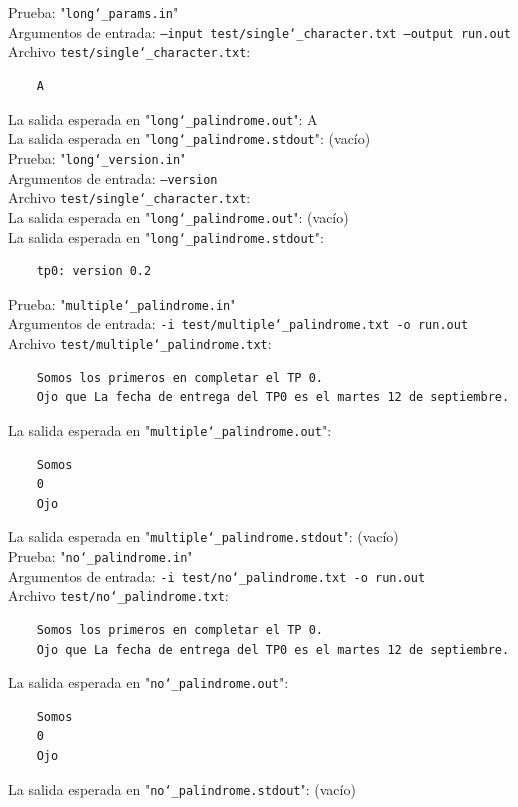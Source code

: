 \documentclass[a4paper,10pt]{article}
\begin{document}
      Prueba: "\texttt{long\char`_params.in}" \\
    Argumentos de entrada: \texttt{--input test/single\char`_character.txt --output run.out}\\
    Archivo \texttt{test/single\char`_character.txt}: \\
    \begin{Verbatim}
    A
    \end{Verbatim}
    La salida esperada en "\texttt{long\char`_palindrome.out}": A\\
    La salida esperada en "\texttt{long\char`_palindrome.stdout}": (vacío)\\
  
        Prueba: "\texttt{long\char`_version.in}" \\
    Argumentos de entrada: \texttt{--version}\\
    Archivo \texttt{test/single\char`_character.txt}: \\

    La salida esperada en "\texttt{long\char`_palindrome.out}": (vacío)\\
    La salida esperada en "\texttt{long\char`_palindrome.stdout}": \\
    \begin{Verbatim}
    tp0: version 0.2
    \end{Verbatim}
  
    Prueba: "\texttt{multiple\char`_palindrome.in}" \\
    Argumentos de entrada: \texttt{-i test/multiple\char`_palindrome.txt -o run.out}\\
    Archivo \texttt{test/multiple\char`_palindrome.txt}: \\
    \begin{Verbatim}
    Somos los primeros en completar el TP 0.
    Ojo que La fecha de entrega del TP0 es el martes 12 de septiembre.
    \end{Verbatim}
    La salida esperada en "\texttt{multiple\char`_palindrome.out}":\\
        \begin{Verbatim}
    Somos
    0
    Ojo
    \end{Verbatim}
    La salida esperada en "\texttt{multiple\char`_palindrome.stdout}": (vacío)\\
  
    Prueba: "\texttt{no\char`_palindrome.in}" \\
    Argumentos de entrada: \texttt{-i test/no\char`_palindrome.txt -o run.out}\\
    Archivo \texttt{test/no\char`_palindrome.txt}: \\
    \begin{Verbatim}
    Somos los primeros en completar el TP 0.
    Ojo que La fecha de entrega del TP0 es el martes 12 de septiembre.
    \end{Verbatim}
    La salida esperada en "\texttt{no\char`_palindrome.out}":\\
        \begin{Verbatim}
    Somos
    0
    Ojo
    \end{Verbatim}
    La salida esperada en "\texttt{no\char`_palindrome.stdout}": (vacío)\\
    
\end{document}
